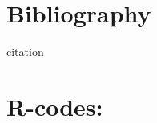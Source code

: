 \documentclass{article}\usepackage[]{graphicx}\usepackage[]{color}
\begin{document}
\section{Bibliography}
 \begin{thebibliography}{99}

\item citation

\end{thebibliography}

\section{R-codes:}




\end{document}
